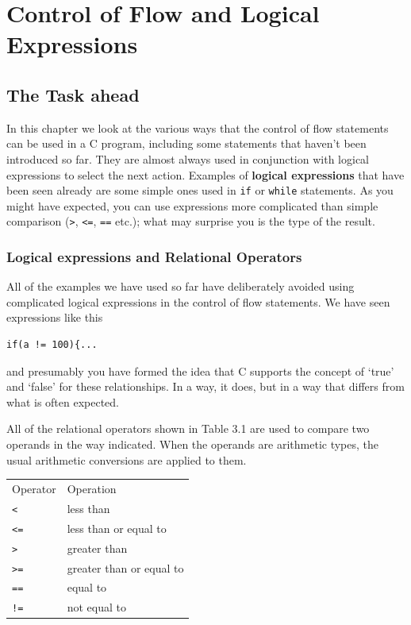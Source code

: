  \chapter{Control of Flow and Logical Expressions}


        \section{The Task ahead}
        

  

  In this chapter we look at the various ways that the control of flow
   statements can be used in a C program, including some statements that
   haven't been introduced so far. They are almost always used in conjunction
   with logical expressions to select the next action. Examples of
   \textbf{logical expressions} that have been seen already are some simple
   ones used in \texttt{if} or \texttt{while} statements. As you might
   have expected, you can use expressions more complicated than simple
   comparison (\texttt{>}, \texttt{<=}, \texttt{==} etc.);
   what may surprise you is the type of the result.


  \subsection{Logical expressions and Relational Operators}
   

   All of the examples we have used so far have deliberately avoided using
    complicated logical expressions in the control of flow statements. We have
    seen expressions like this


   \begin{Verbatim}
if(a != 100){...
\end{Verbatim}

   and presumably you have formed the idea that C supports the concept
    of `true' and `false' for these relationships. In a way, it
    does, but in a way that differs from what is often expected.


   All of the relational operators shown in Table 3.1 are used
    to compare two operands in the way indicated. When the operands are
    arithmetic types, the usual arithmetic conversions are applied to
    them.


   \begin{tabular}{lp{\textwidth}}
     Operator & Operation
    \\

     \texttt{<} & less than
    \\

     \texttt{<=} & less than or equal to
    \\

     \texttt{>} & greater than
    \\

     \texttt{>=} & greater than or equal to
    \\

     \texttt{==} & equal to
    \\

     \texttt{!=} & not equal to
    \\
\end{tabular}

